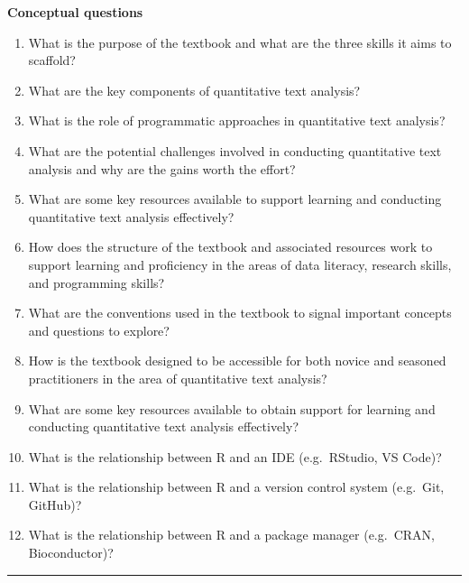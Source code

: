 \documentclass[
  letterpaper,
]{latex/krantz}
\providecommand{\tightlist}{%
  \setlength{\itemsep}{0pt}\setlength{\parskip}{0pt}}\usepackage{longtable,booktabs,array}
\begin{document}
\begin{tcolorbox}[enhanced jigsaw, arc=.35mm, leftrule=.75mm, rightrule=.15mm, opacityback=0, colback=white, breakable, bottomrule=.15mm, left=2mm, toprule=.15mm]

\textbf{Conceptual questions}

\begin{enumerate}
\def\labelenumi{\arabic{enumi}.}
\tightlist
\item
  What is the purpose of the textbook and what are the three skills it
  aims to scaffold?
\item
  What are the key components of quantitative text analysis?
\item
  What is the role of programmatic approaches in quantitative text
  analysis?
\item
  What are the potential challenges involved in conducting quantitative
  text analysis and why are the gains worth the effort?
\item
  What are some key resources available to support learning and
  conducting quantitative text analysis effectively?
\item
  How does the structure of the textbook and associated resources work
  to support learning and proficiency in the areas of data literacy,
  research skills, and programming skills?
\item
  What are the conventions used in the textbook to signal important
  concepts and questions to explore?
\item
  How is the textbook designed to be accessible for both novice and
  seasoned practitioners in the area of quantitative text analysis?
\item
  What are some key resources available to obtain support for learning
  and conducting quantitative text analysis effectively?
\item
  What is the relationship between R and an IDE (e.g.~RStudio, VS Code)?
\item
  What is the relationship between R and a version control system
  (e.g.~Git, GitHub)?
\item
  What is the relationship between R and a package manager (e.g.~CRAN,
  Bioconductor)?
\end{enumerate}

\begin{center}\rule{0.5\linewidth}{0.5pt}\end{center}


\end{tcolorbox}
\end{document}

